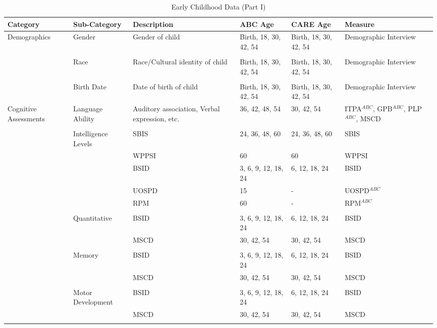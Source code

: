 \begin{sidewaystable}[H]
\caption{Early Childhood Data (Part I)} \label{tab:ecvars_1}
\centering
\begin{adjustbox}{max width=\textwidth, max height=\textheight,keepaspectratio}
\begin{threeparttable}
\tiny
\begin{tabular}{L{3cm} C{3.5cm} C{4cm} C{1.5cm} C{1.5cm}  C{6cm}}
\hline \hline
Category	&	Sub-Category	&	Description	&	ABC Age  	&  CARE Age  & 	Measure	\\ \midrule
Demographics	&	Gender	&	Gender of child	&	Birth, 18, 30, 42, 54	&	 Birth, 18, 30, 42, 54	&	Demographic Interview	\\
	&	\\
	&	Race	&	Race/Cultural identity of child	&	Birth, 18, 30, 42, 54	&	 Birth, 18, 30, 42, 54	&	 Demographic Interview\\
	&	\\
	&	Birth Date	&	Date of birth of child	&	Birth, 18, 30, 42, 54	& 	Birth, 18, 30, 42, 54	&	 Demographic Interview	\\ \midrule
Cognitive Assessments	&	Language Ability	&	Auditory association, Verbal expression, etc. 	&	36, 42, 48, 54	&	30, 42, 54	&	ITPA$^{ABC}$, GPB$^{ABC}$, PLP$^{ABC}$, MSCD \\
	&	\\
	&	Intelligence Levels	&	SBIS 	&	24, 36, 48, 60	&	24, 36, 48, 60	&	SBIS	\\
	&		&	WPPSI	&	60	&	60	&	WPPSI	\\
	&		&	BSID 	&	3, 6, 9, 12, 18, 24	&	6, 12, 18, 24		&	BSID	\\
	&		&	UOSPD	&	15	&	- 	&	UOSPD$^{ABC}$	\\
	&		&	RPM	&	60	&	-	&	RPM$^{ABC}$	\\
	&	\\
	&	Quantitative	 &	BSID 	&	3, 6, 9, 12, 18, 24	&	6, 12, 18, 24		&	BSID	\\
	&		&	MSCD 	&	30, 42, 54		&	30, 42, 54	&	MSCD	\\
	&	\\
	&	Memory	&	BSID 	&	3, 6, 9, 12, 18, 24	& 	6, 12, 18, 24		&	BSID	\\
	&		&	MSCD 	&	30, 42, 54	&	30, 42, 54	&	MSCD	\\
	&	\\
	&	Motor Development	&	BSID 	&	3, 6, 9, 12, 18, 24	&	6, 12, 18, 24		&	BSID\\
	&		&	MSCD 	&	30, 42, 54	&	30, 42, 54	&	MSCD	\\
	& 	\\

\end{tabular}
\end{threeparttable}
\end{adjustbox}
\end{sidewaystable}
